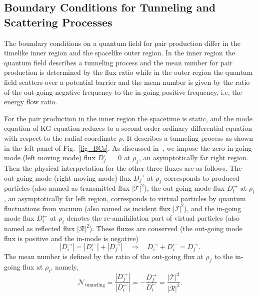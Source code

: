 \documentclass[aps,nofootinbib,superscriptaddress
]{revtex4}
\begin{document}
\begin{appendix}

\section{Boundary Conditions for Tunneling and Scattering Processes} \label{app_A}
The boundary conditions on a quantum field for pair production differ in the timelike inner region and the spacelike outer region. In the inner region the quantum field describes a tunneling process and the mean number for pair production is determined by the flux ratio while in the outer region the quantum field scatters over a potential barrier and the mean number is given by the ratio of the out-going negative frequency to the in-going positive frequency, i.e, the energy flow ratio.


For the pair production in the inner region the spacetime is static, and the mode equation of KG equation reduces to a second order ordinary differential equation with respect to the radial coordinate $\rho$. It describes a tunneling process as shown in the left panel of Fig.~\ref{fig_BCs}. As discussed in~\cite{Chen:2012zn}, we impose the zero in-going mode (left moving mode) flux $D_f^\leftarrow = 0$ at $\rho_f$, an asymptotically far right region. Then the physical interpretation for the other three fluxes are as follows. The out-going mode (right moving mode) flux  $D_f^\rightarrow$ at $\rho_f$ corresponds to produced particles (also named as transmitted flux $|\mathcal{T}|^2$), the out-going mode flux $D_i^\rightarrow $ at $\rho_i$, an asymptotically far left region, corresponds to virtual particles by quantum fluctuations from vacuum (also named as incident flux $|\mathcal{I}|^2$), and the in-going mode flux $D_i^\leftarrow $ at $\rho_i$ denotes the re-annihilation part of virtual particles (also named as reflected flux $|\mathcal{R}|^2$). These fluxes are conserved (the out-going mode flux is positive and the in-mode is negative)
\begin{equation}
| D_i^\rightarrow | = | D_i^\leftarrow | + | D_f^\rightarrow | \quad \Rightarrow \quad D_i^\rightarrow + D_i^\leftarrow = D_f^\rightarrow.
\end{equation}
The mean number is defined by the ratio of the out-going flux at $\rho_f$ to the in-going flux at $\rho_i$, namely,
\begin{equation}
\mathcal{N}_\mathrm{tunneling} = \frac{| D_f^\rightarrow |}{| D_i^\leftarrow |} = - \frac{D_f^\rightarrow}{D_i^\leftarrow} = \frac{|\mathcal{T}|^2}{|\mathcal{R}|^2}.
\end{equation}



\end{appendix}
\end{document}
